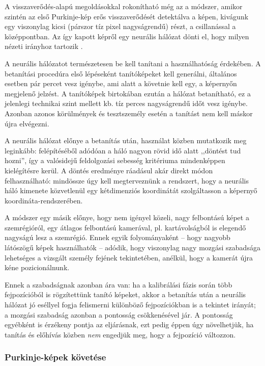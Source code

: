 \bigskip

A visszaverődés-alapú megoldásokkal rokonítható még az a módszer, amikor szintén az első Purkinje-kép erős visszaverődését detektálva a képen, kivágunk egy viszonylag kicsi (párszor tíz pixel nagyságrendű) részt, a csillanással a középpontban. Az így kapott képről egy neurális hálózat dönti el, hogy milyen nézeti irányhoz tartozik \cite{baluja}.

A neurális hálózatot természetesen be kell tanítani a használhatóság érdekében. A betanítási procedúra első lépéseként tanítóképeket kell generálni, általános esetben pár percet vesz igénybe, ami alatt a követnie kell egy, a képernyőn megjelenő jelzést. A tanítóképek birtokában ezután a hálózat betanítható, ez a jelenlegi technikai szint mellett kb. tíz perces nagyságrendű időt vesz igénybe. Azonban azonos körülmények és tesztszemély esetén a tanítást nem kell máskor újra elvégezni.

A neurális hálózat előnye a betanítás után, használat közben mutatkozik meg leginkább: felépítéséből adódóan a háló nagyon rövid idő alatt ,,döntést tud hozni'', így a valósidejű feldolgozási sebesség kritériuma mindenképpen kielégítésre kerül. A döntés eredménye ráadásul akár direkt módon felhasználható: mindössze úgy kell megterveznünk a rendszert, hogy a neurális háló kimenete közvetlenül egy kétdimenziós koordinátát szolgáltasson a képernyő koordináta-rendszerében.

A módszer egy másik előnye, hogy nem igényel közeli, nagy felbontású képet a szemrégióról, egy átlagos felbontású kamerával, pl. kartávolságból is elegendő nagyságú lesz a szemrégió. Ennek egyik folyományaként -- hogy nagyobb látószögű képek használhatók -- adódik, hogy viszonylag nagy mozgási szabadsága lehetséges a vizsgált személy fejének tekintetében, anélkül, hogy a kamerát újra kéne pozicionálnunk.

Ennek a szabadságnak azonban ára van: ha a kalibrálási fázis során több fejpozícióból is rögzítettünk tanító képeket, akkor a betanítás után a neurális hálózat jó eséllyel fogja felismerni különböző fejpozíciókban is a tekintet irányát; a mozgási szabadság azonban a pontosság csökkenésével jár. A pontosság egyébként is érzékeny pontja az eljárásnak, ezt pedig éppen úgy növelhetjük, ha tanítás és előhívás közben \emph{nem} engedjük meg, hogy a fejpozíció változzon.

\subsubsection{Purkinje-képek követése}\label{sect:purkinje}

